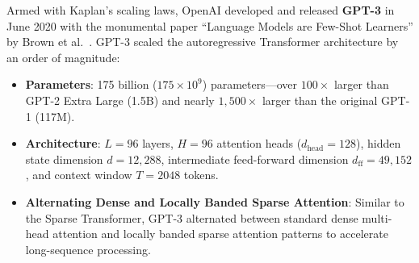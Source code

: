 \documentclass[../../main.tex]{subfiles}
\begin{document}
Armed with Kaplan's scaling laws, OpenAI developed and released \textbf{GPT-3} in June 2020 with the monumental paper ``Language Models are Few-Shot Learners'' by Brown et al.~\cite{brown2020}. GPT-3 scaled the autoregressive Transformer architecture by an order of magnitude:
\begin{itemize}
    \item \textbf{Parameters}: 175 billion ($175 \times 10^9$) parameters---over $100\times$ larger than GPT-2 Extra Large (1.5B) and nearly $1,500\times$ larger than the original GPT-1 (117M).
    \item \textbf{Architecture}: $L = 96$ layers, $H = 96$ attention heads ($d_{\text{head}} = 128$), hidden state dimension $d = 12,288$, intermediate feed-forward dimension $d_{\text{ff}} = 49,152$, and context window $T = 2048$ tokens.
    \item \textbf{Alternating Dense and Locally Banded Sparse Attention}: Similar to the Sparse Transformer, GPT-3 alternated between standard dense multi-head attention and locally banded sparse attention patterns to accelerate long-sequence processing.
\end{itemize}
\end{document}
